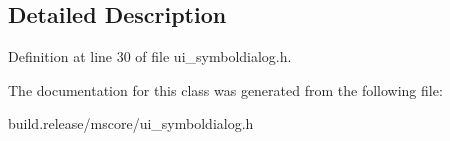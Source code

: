 \subsection{Detailed Description}


Definition at line 30 of file ui\+\_\+symboldialog.\+h.



The documentation for this class was generated from the following file\+:\begin{DoxyCompactItemize}
\item 
build.\+release/mscore/ui\+\_\+symboldialog.\+h\end{DoxyCompactItemize}
